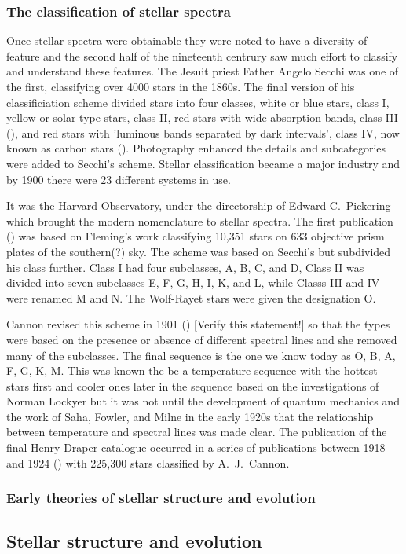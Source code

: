 \subsubsection{The classification of stellar spectra}

Once stellar spectra were obtainable  they were
noted to have a diversity of feature and the second half of the
nineteenth centrury saw much effort to classify and understand these
features.  The Jesuit priest Father Angelo Secchi was one of the
first, classifying over 4000 stars in the 1860s.  The final version of
his classificiation scheme  divided stars into four
classes, white or blue stars, class I, yellow or solar type stars,
class II, red stars with wide absorption bands, class III
(\cite{Secchi1863}), and red stars with 'luminous bands separated by
dark intervals', class IV, now known as carbon stars
(\cite{Secchi1868}). Photography enhanced the details and subcategories
were added to Secchi's scheme.  Stellar classification became a major
industry and by 1900 there were 23 different systems in use.

It was the Harvard Observatory, under the directorship of Edward C.\
Pickering which brought the modern nomenclature to stellar spectra.
The first publication (\cite{Pickering1890}) was based on Fleming's
work classifying 10,351 stars on 633 objective prism plates of the
southern(?) sky. The scheme was based on Secchi's but subdivided his
class further. Class I had four subclasses, A, B, C, and D, Class II
was divided into seven subclasses E, F, G, H, I, K, and L, while
Classs III and IV were renamed M and N.  The Wolf-Rayet stars were
given the designation O.

Cannon  revised this scheme in 1901
(\cite{Cannon1901}) [Verify this statement!] so that the types were
based on the presence or absence of different spectral lines and she
removed many of the subclasses.  The final sequence is the one we know
today as O, B, A, F, G, K, M. This was known the be a temperature
sequence with the hottest stars first and cooler ones later in the
sequence based on the investigations of Norman Lockyer but it was not
until the development of quantum mechanics and the work of Saha,
Fowler, and Milne in the early 1920s that the relationship between
temperature and spectral lines was made clear. The
publication  of the final Henry Draper catalogue
occurred in a series of publications between 1918 and 1924
(\cite{Cannon1918a, Cannon1918b, Cannon1919a, Cannon1919b, Cannon1920,
Cannon1921, Cannon1922, Cannon1923, Cannon1924}) with 225,300 stars
classified by A.\ J.\ Cannon.

\subsubsection{Early theories of stellar structure and evolution}



\subsection{Stellar structure and evolution}

